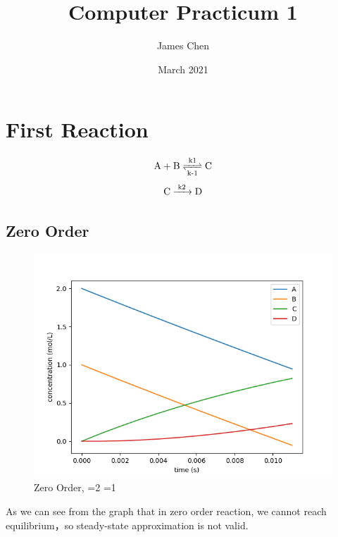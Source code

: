 \documentclass{article}
\title{Computer Practicum 1}
\author{James Chen}
\date{March 2021}
\begin{document}
\maketitle

\section{First Reaction}
\begin{equation}
    \ce{A + B <=>T[k1][k-1] C}
\end{equation}
\begin{equation}
    \ce{C ->T[k2] D}
\end{equation}
\subsection{Zero Order}
\begin{figure}[H]
\centering
\includegraphics[scale=0.6]{1. zero.png}
\caption{Zero Order, =2 =1}
\end{figure}
As we can see from the graph that in zero order reaction, we cannot reach equilibrium，so steady-state approximation is not valid.
\end{document}
